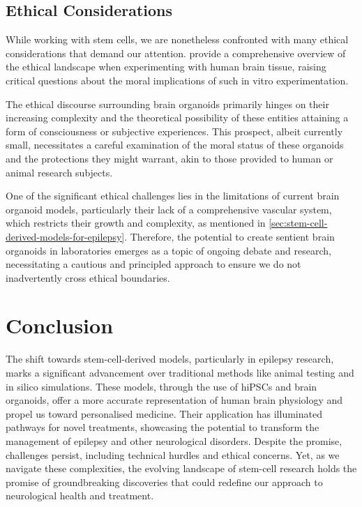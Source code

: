 \documentclass[10pt]{article}
\begin{document}
\begin{sloppypar}
  \subsection{Ethical Considerations}
  \label{sec:ethical-considerations}

  While working with stem cells, we are nonetheless confronted with many ethical considerations that demand our attention. \citeauthor{farahany_ethics_2018} \citeyearpar{farahany_ethics_2018} provide a comprehensive overview of the ethical landscape when experimenting with human brain tissue, raising critical questions about the moral implications of such in vitro experimentation.

  The ethical discourse surrounding brain organoids primarily hinges on their increasing complexity and the theoretical possibility of these entities attaining a form of consciousness or subjective experiences. This prospect, albeit currently small, necessitates a careful examination of the moral status of these organoids and the protections they might warrant, akin to those provided to human or animal research subjects.

  One of the significant ethical challenges lies in the limitations of current brain organoid models, particularly their lack of a comprehensive vascular system, which restricts their growth and complexity, as mentioned in \autoref{sec:stem-cell-derived-models-for-epilepsy}. Therefore, the potential to create sentient brain organoids in laboratories emerges as a topic of ongoing debate and research, necessitating a cautious and principled approach to ensure we do not inadvertently cross ethical boundaries.

  \section{Conclusion}
  \label{sec:conclusion}

  The shift towards stem-cell-derived models, particularly in epilepsy research, marks a significant advancement over traditional methods like animal testing and in silico simulations. These models, through the use of hiPSCs and brain organoids, offer a more accurate representation of human brain physiology and propel us toward personalised medicine. Their application has illuminated pathways for novel treatments, showcasing the potential to transform the management of epilepsy and other neurological disorders. Despite the promise, challenges persist, including technical hurdles and ethical concerns. Yet, as we navigate these complexities, the evolving landscape of stem-cell research holds the promise of groundbreaking discoveries that could redefine our approach to neurological health and treatment.


  \pagebreak
  
  

\end{sloppypar}
\end{document}
